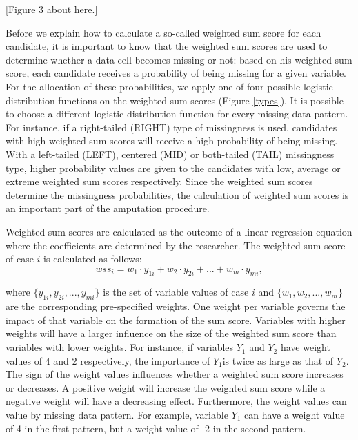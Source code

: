 \documentclass[]{interact}
\begin{document}
[Figure 3 about here.]

Before we explain how to calculate a so-called weighted sum score for each candidate, it is important to know that the weighted sum scores are used to determine whether a data cell becomes missing or not: based on his weighted sum score, each candidate receives a probability of being missing for a given variable. For the allocation of these probabilities, we apply one of four possible logistic distribution functions on the weighted sum scores (Figure \ref{types}). It is possible to choose a different logistic distribution function for every missing data pattern. For instance, if a right-tailed (RIGHT) type of missingness is used, candidates with high weighted sum scores will receive a high probability of being missing. With a left-tailed (LEFT), centered (MID) or both-tailed (TAIL) missingness type, higher probability values are given to the candidates with low, average or extreme weighted sum scores respectively. Since the weighted sum scores determine the  missingness probabilities, the calculation of weighted sum scores is an important part of the amputation procedure. 

Weighted sum scores are calculated as the outcome of a linear regression equation where the coefficients are determined by the researcher. The weighted sum score of case $i$ is calculated as follows:
\[
wss_i = w_1 \cdot y_{1i} + w_2 \cdot y_{2i} + ... + w_m \cdot y_{mi},
\]

\noindent where $\{y_{1i}, y_{2i}, ..., y_{mi}\}$ is the set of variable values of case $i$ and $\{w_1, w_2, ..., w_m\}$ are the corresponding pre-specified weights. One weight per variable governs the impact of that variable on the formation of the sum score. Variables with higher weights will have a larger influence on the size of the weighted sum score than variables with lower weights. For instance, if variables $Y_1$ and $Y_2$ have weight values of 4 and 2 respectively, the importance of $Y_1$is twice as large as that of $Y_2$. The sign of the weight values influences whether a weighted sum score increases or decreases. A positive weight will increase the weighted sum score while a negative weight will have a decreasing effect. Furthermore, the weight values can value by missing data pattern. For example, variable $Y_1$ can have a weight value of 4 in the first pattern, but a weight value of -2 in the second pattern. 
\end{document}
